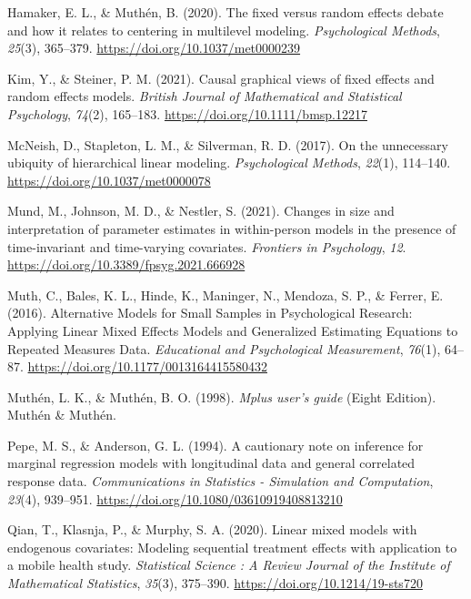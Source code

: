 \documentclass[
  12pt,
  a4paper,
]{article}
\newlength{\cslhangindent}
\newlength{\cslentryspacingunit} %
\newenvironment{CSLReferences}[2] %
 {%
  \setlength{\parindent}{0pt}
  \ifodd #1
  \let\oldpar\par
  \def\par{\hangindent=\cslhangindent\oldpar}
  \fi
  \setlength{\parskip}{#2\cslentryspacingunit}
 }%
 {}
\begin{document}
\begin{CSLReferences}{1}{0}
\leavevmode{}%
Hamaker, E. L., \& Muthén, B. (2020). The fixed versus random effects
debate and how it relates to centering in multilevel modeling.
\emph{Psychological Methods}, \emph{25}(3), 365--379.
\url{https://doi.org/10.1037/met0000239}

\leavevmode{}%
Kim, Y., \& Steiner, P. M. (2021). Causal graphical views of fixed
effects and random effects models. \emph{British Journal of Mathematical
and Statistical Psychology}, \emph{74}(2), 165--183.
\url{https://doi.org/10.1111/bmsp.12217}

\leavevmode{}%
McNeish, D., Stapleton, L. M., \& Silverman, R. D. (2017). On the
unnecessary ubiquity of hierarchical linear modeling.
\emph{Psychological Methods}, \emph{22}(1), 114--140.
\url{https://doi.org/10.1037/met0000078}

\leavevmode{}%
Mund, M., Johnson, M. D., \& Nestler, S. (2021). Changes in size and
interpretation of parameter estimates in within-person models in the
presence of time-invariant and time-varying covariates. \emph{Frontiers
in Psychology}, \emph{12}.
\url{https://doi.org/10.3389/fpsyg.2021.666928}

\leavevmode{}%
Muth, C., Bales, K. L., Hinde, K., Maninger, N., Mendoza, S. P., \&
Ferrer, E. (2016). Alternative Models for Small Samples in Psychological
Research: Applying Linear Mixed Effects Models and Generalized
Estimating Equations to Repeated Measures Data. \emph{Educational and
Psychological Measurement}, \emph{76}(1), 64--87.
\url{https://doi.org/10.1177/0013164415580432}

\leavevmode{}%
Muthén, L. K., \& Muthén, B. O. (1998). \emph{Mplus user's guide} (Eight
Edition). Muthén \& Muthén.

\leavevmode{}%
Pepe, M. S., \& Anderson, G. L. (1994). A cautionary note on inference
for marginal regression models with longitudinal data and general
correlated response data. \emph{Communications in Statistics -
Simulation and Computation}, \emph{23}(4), 939--951.
\url{https://doi.org/10.1080/03610919408813210}

\leavevmode{}%
Qian, T., Klasnja, P., \& Murphy, S. A. (2020). Linear mixed models with
endogenous covariates: Modeling sequential treatment effects with
application to a mobile health study. \emph{Statistical Science : A
Review Journal of the Institute of Mathematical Statistics},
\emph{35}(3), 375--390. \url{https://doi.org/10.1214/19-sts720}


\end{CSLReferences}
\end{document}
